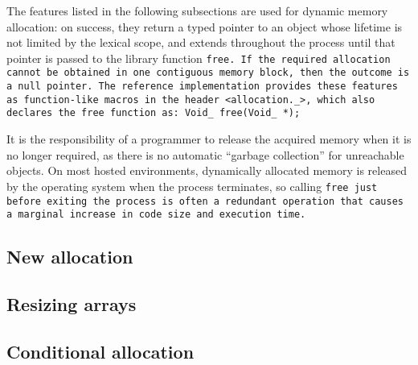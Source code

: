 \def\Subsection#1{\subsection{#1}}

The features listed in the following subsections are used for dynamic
memory allocation: on success, they return a typed pointer to an object
whose lifetime is not limited by the lexical scope, and extends throughout
the process until that pointer is passed to the library function \tt{free}.
If the required allocation cannot be obtained in one contiguous memory block,
then the outcome is a null pointer.
The reference implementation provides these features as
function-like macros in the header \tt{<allocation._>},
which also declares the \tt{free} function as: \tt{Void_ free(Void_ *);}

\note It is the responsibility of a programmer to release
the acquired memory when it is no longer required,
as there is no automatic ``garbage collection'' for unreachable objects.
On most hosted environments, dynamically allocated memory is
released by the operating system when the process terminates,
so calling \tt{free} just before exiting the process is often a redundant
operation that causes a marginal increase in code size and execution time.

\Subsection{New allocation}

\Subsection{Resizing arrays}

\Subsection{Conditional allocation}
